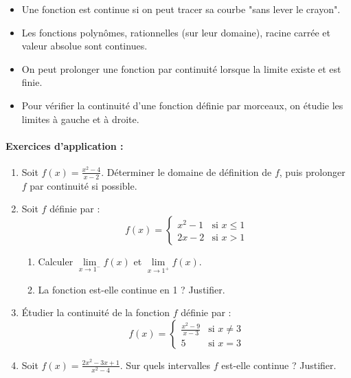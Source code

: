 \documentclass[12pt,a4paper]{article}
\begin{document}
\begin{tcolorbox}[colback=gray!5!white, colframe=black!75!black]
\begin{itemize}
    \item Une fonction est continue si on peut tracer sa courbe "sans lever le crayon".
    \item Les fonctions polynômes, rationnelles (sur leur domaine), racine carrée et valeur absolue sont continues.
    \item On peut prolonger une fonction par continuité lorsque la limite existe et est finie.
    \item Pour vérifier la continuité d'une fonction définie par morceaux, on étudie les limites à gauche et à droite.
\end{itemize}
\end{tcolorbox}

\paragraph{Exercices d'application :}

\begin{enumerate}
    \item Soit \( f(x) = \frac{x^2 - 4}{x - 2} \). Déterminer le domaine de définition de \( f \), puis prolonger \( f \) par continuité si possible.
    
    \item Soit \( f \) définie par :
    \[
    f(x) = 
    \begin{cases}
        x^2 - 1 & \text{si } x \leq 1 \\
        2x - 2 & \text{si } x > 1
    \end{cases}
    \]
    \begin{enumerate}
        \item Calculer \( \lim\limits_{x \to 1^-} f(x) \) et \( \lim\limits_{x \to 1^+} f(x) \).
        \item La fonction est-elle continue en 1 ? Justifier.
    \end{enumerate}

    \item Étudier la continuité de la fonction \( f \) définie par :
    \[
    f(x) = 
    \begin{cases}
        \frac{x^2 - 9}{x - 3} & \text{si } x \neq 3 \\
        5 & \text{si } x = 3
    \end{cases}
    \]
    
    \item Soit \( f(x) = \frac{2x^2 - 3x + 1}{x^2 - 4} \). Sur quels intervalles \( f \) est-elle continue ? Justifier.
\end{enumerate}
\end{document}

